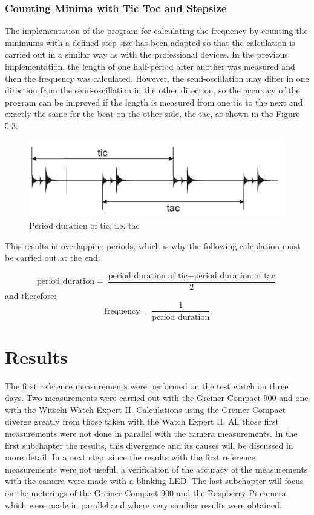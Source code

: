 \documentclass[12pt, a4paper]{report}
\begin{document}
    \subsection{Counting Minima with Tic Toc and Stepsize}
  The implementation of the program for calculating the frequency by counting the minimums with a defined step size has been adapted so that the calculation is carried out in a similar way as with the professional devices. In the previous implementation, the length of one half-period after another was measured and then the frequency was calculated. However, the semi-oscillation may differ in one direction from the semi-oscillation in the other direction, so the accuracy of the program can be improved if the length is measured from one tic to the next and exactly the same for the beat on the other side, the tac, as shown in the Figure 5.3. 
       \noindent
    \begin{figure}[H]
        \centering
        \includegraphics[scale=0.4]{Images/gangdeviation.png}
    
    \caption{Period duration of tic, i.e. tac}
    \end{figure}    
  
  This results in overlapping periods, which is why the following calculation must be carried out at the end:
  
       \begin{displaymath}
     \text{period duration} = \frac{\text{period duration of tic} + \text{period duration of tac}}{2} 
     \end{displaymath}
  and therefore: 
       \begin{displaymath}
      \text{frequency}= \frac{1}{\text{period duration}}
     \end{displaymath}
     
    
    \chapter{Results}
        The first reference measurements were performed on the test watch on three days. Two measurements were carried out with the Greiner Compact 900 and one with the Witschi Watch Expert II. Calculations using the Greiner Compact diverge greatly from those taken with the Watch Expert II. All those first measurements were not done in parallel with the camera measurements. In the first subchapter the results, this divergence and its causes will be discussed in more detail. In a next step, since the results with the first reference measurements were not useful, a verification of the accuracy of the measurements with the camera were made with a blinking LED. The last subchapter will focus on the meterings of the Greiner Compact 900 and the Raspberry Pi camera which were made in parallel and where very similiar results were obtained. 
\end{document}
